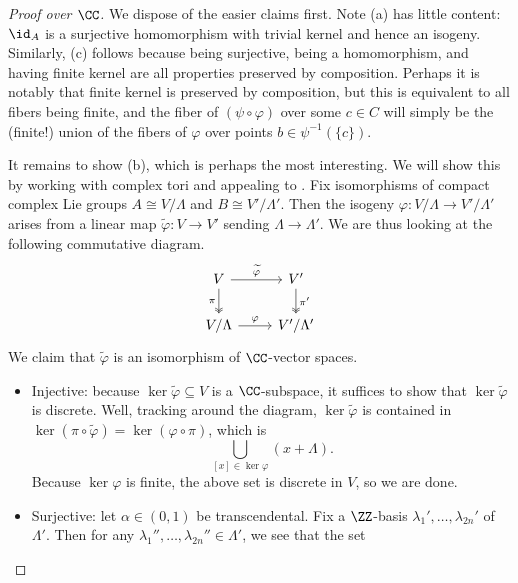 \documentclass[../notes.tex]{subfiles}
\begin{document}
\begin{proof}[Proof over $\CC$]
	We dispose of the easier claims first. Note (a) has little content: $\id_A$ is a surjective homomorphism with trivial kernel and hence an isogeny. Similarly, (c) follows because being surjective, being a homomorphism, and having finite kernel are all properties preserved by composition. Perhaps it is notably that finite kernel is preserved by composition, but this is equivalent to all fibers being finite, and the fiber of $(\psi\circ\varphi)$ over some $c\in C$ will simply be the (finite!) union of the fibers of $\varphi$ over points $b\in\psi^{-1}(\{c\})$.

	It remains to show (b), which is perhaps the most interesting. We will show this by working with complex tori and appealing to . Fix isomorphisms of compact complex Lie groups $A\cong V/\Lambda$ and $B\cong V'/\Lambda'$. Then the isogeny $\varphi\colon V/\Lambda\to V'/\Lambda'$ arises from a linear map $\widetilde\varphi\colon V\to V'$ sending $\Lambda\to\Lambda'$. We are thus looking at the following commutative diagram.
	\[\begin{tikzcd}
		V & {V'} \\
		{V/\Lambda} & {V'/\Lambda'}
		\arrow["\widetilde\varphi", from=1-1, to=1-2]
		\arrow["\varphi", from=2-1, to=2-2]
		\arrow["\pi"', two heads, from=1-1, to=2-1]
		\arrow["{\pi'}", two heads, from=1-2, to=2-2]
	\end{tikzcd}\]
	We claim that $\widetilde\varphi$ is an isomorphism of $\CC$-vector spaces.
	\begin{itemize}
		\item Injective: because $\ker\widetilde\varphi\subseteq V$ is a $\CC$-subspace, it suffices to show that $\ker\widetilde\varphi$ is discrete. Well, tracking around the diagram, $\ker\widetilde\varphi$ is contained in $\ker(\pi\circ\widetilde\varphi)=\ker(\varphi\circ\pi)$, which is
		\[\bigcup_{[x]\in\ker\varphi}(x+\Lambda).\]
		Because $\ker\varphi$ is finite, the above set is discrete in $V$, so we are done.
		\item Surjective: let $\alpha\in(0,1)$ be transcendental. Fix a $\ZZ$-basis $\lambda_1',\ldots,\lambda_{2n}'$ of $\Lambda'$. Then for any $\lambda_1'',\ldots,\lambda_{2n}''\in\Lambda'$, we see that the set

\end{itemize}
\end{proof}
\end{document}
